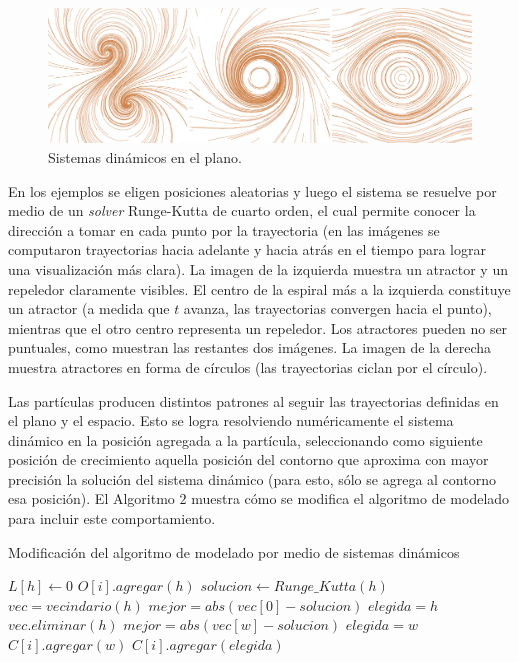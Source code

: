 \begin{figure}[htb!]
  \centerline{\includegraphics[width=12cm]{figures/Fig2}}
  \caption{Sistemas dinámicos en el plano.}
  \label{fg:sistdin2}
\end{figure}

En los ejemplos se eligen posiciones aleatorias y luego el sistema se resuelve por medio de un {\em solver} Runge-Kutta de cuarto orden, el cual permite conocer la direcci\'on a tomar en cada punto por la trayectoria (en las im\'agenes se computaron trayectorias hacia adelante y hacia atrás en el tiempo para lograr una visualizaci\'on más clara).
La imagen de la izquierda muestra un atractor y un repeledor claramente visibles.
El centro de la espiral m\'as a la izquierda constituye un atractor (a medida que $t$ avanza, las trayectorias convergen hacia el punto), mientras que el otro centro representa un repeledor.
Los atractores pueden no ser puntuales, como muestran las restantes dos im\'agenes.
La imagen de la derecha muestra atractores en forma de c\'irculos (las trayectorias ciclan por el c\'irculo).

Las part\'iculas producen distintos patrones al seguir las trayectorias definidas en el plano y el espacio.
Esto se logra resolviendo num\'ericamente el sistema din\'amico en la posici\'on agregada a la part\'icula, seleccionando como siguiente posici\'on de crecimiento aquella posici\'on del contorno que aproxima con mayor precisión la soluci\'on del sistema din\'amico (para esto, sólo se agrega al contorno esa posición).
El Algoritmo $2$ muestra cómo se modifica el algoritmo de modelado para incluir este comportamiento.

\begin{algorithm}[h!]
\caption{Modificación del algoritmo de modelado por medio de sistemas dinámicos}
\begin{algorithmic}
\State $L[h]\gets 0$ 
\State $O[i].agregar(h)$
\State $solucion \gets Runge\_Kutta(h)$
\State $vec = vecindario(h)$
\State $mejor = abs(vec[0] - solucion)$
\State $elegida = h$
\State $vec.eliminar(h)$
        \State $mejor = abs(vec[w]-solucion)$
        \State $elegida = w$
    \EndIf
        \State $C[i].agregar(w)$
    \EndIf
\EndFor
{}
\State $C[i].agregar(elegida)$
\end{algorithmic}
\end{algorithm}

